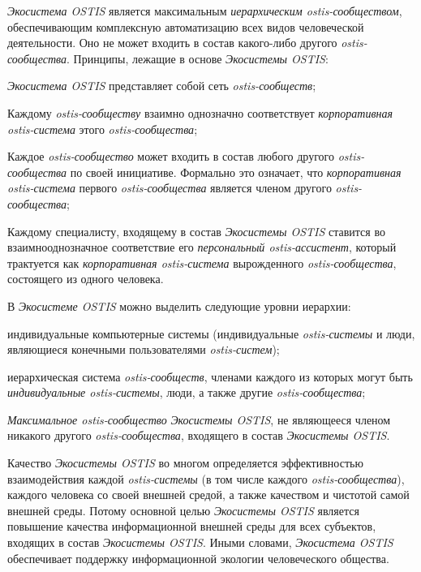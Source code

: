 \textit{Экосистема OSTIS} является максимальным \textit{иерархическим ostis-сообществом}, обеспечивающим комплексную автоматизацию всех видов человеческой деятельности. 
Оно не может входить в состав какого-либо другого \textit{ostis-сообщества}. 
Принципы, лежащие в основе \textit{Экосистемы OSTIS}:
\begin{textitemize}
    \item \textit{Экосистема OSTIS} представляет собой сеть \textit{ostis-сообществ};
    \item Каждому \textit{ostis-сообществу} взаимно однозначно соответствует \textit{корпоративная ostis-система} этого \textit{ostis-сообщества};
    \item Каждое \textit{ostis-сообщество} может входить в состав любого другого \textit{ostis-сообщества} по своей инициативе. Формально это означает, что \textit{корпоративная ostis-система} первого \textit{ostis-сообщества} является членом другого \textit{ostis-сообщества};
    \item Каждому специалисту, входящему в состав \textit{Экосистемы OSTIS} ставится во взаимнооднозначное соответствие его \textit{персональный ostis-ассистент}, который трактуется как \textit{корпоративная ostis-система} вырожденного \textit{ostis-сообщества}, состоящего из одного человека.
\end{textitemize}

В \textit{Экосистеме OSTIS} можно выделить следующие уровни иерархии:
\begin{textitemize}
    \item индивидуальные компьютерные системы (индивидуальные \textit{ostis-системы} и люди, являющиеся конечными пользователями \textit{ostis-систем});
    \item иерархическая система \textit{ostis-сообществ}, членами каждого из которых могут быть \textit{индивидуальные ostis-системы}, люди, а также другие \textit{ostis-сообщества};
    \item \textit{Максимальное ostis-сообщество} \textit{Экосистемы OSTIS}, не являющееся членом никакого другого \textit{ostis-сообщества}, входящего в состав \textit{Экосистемы OSTIS}.
\end{textitemize}

Качество \textit{Экосистемы OSTIS} во многом определяется эффективностью взаимодействия каждой \textit{ostis-системы} (в том числе каждого \textit{ostis-сообщества}), каждого человека со своей внешней средой, а также качеством и чистотой самой внешней среды. 
Потому основной целью \textit{Экосистемы OSTIS} является повышение качества информационной внешней среды для всех субъектов, входящих в состав \textit{Экосистемы OSTIS}.
Иными словами, \textit{Экосистема OSTIS} обеспечивает поддержку информационной экологии человеческого общества.

